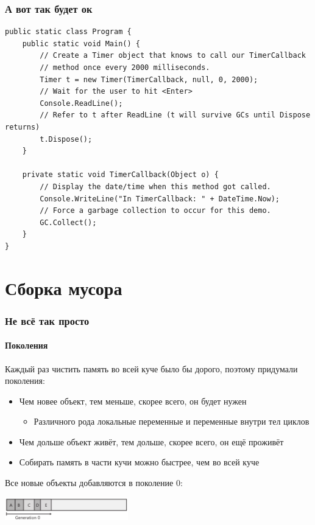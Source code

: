 \documentclass[xetex,mathserif,serif]{beamer}
\begin{document}
	\begin{frame}[fragile]
		\frametitle{А вот так будет ок}
		\begin{footnotesize}
			\begin{verbatim}
public static class Program {
    public static void Main() {
        // Create a Timer object that knows to call our TimerCallback
        // method once every 2000 milliseconds.
        Timer t = new Timer(TimerCallback, null, 0, 2000);
        // Wait for the user to hit <Enter>
        Console.ReadLine();
        // Refer to t after ReadLine (t will survive GCs until Dispose returns)
        t.Dispose();
    }

    private static void TimerCallback(Object o) {
        // Display the date/time when this method got called.
        Console.WriteLine("In TimerCallback: " + DateTime.Now);
        // Force a garbage collection to occur for this demo.
        GC.Collect();
    }
}
			\end{verbatim}
		\end{footnotesize}
	\end{frame}

	\section{Сборка мусора}

	\begin{frame}
		\frametitle{Не всё так просто}
		\framesubtitle{Поколения}
		Каждый раз чистить память во всей куче было бы дорого, поэтому придумали поколения:
		\begin{itemize}
			\item Чем новее объект, тем меньше, скорее всего, он будет нужен
			\begin{itemize}
				\item Различного рода локальные переменные и переменные внутри тел циклов
			\end{itemize}
			\item Чем дольше объект живёт, тем дольше, скорее всего, он ещё проживёт
			\item Собирать память в части кучи можно быстрее, чем во всей куче
		\end{itemize}
		Все новые объекты добавляются в поколение 0:
		\begin{center}
			\includegraphics[width=0.4\textwidth]{generation0.png}
		\end{center}
	\end{frame}
\end{document}
